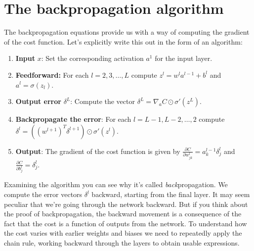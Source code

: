\documentclass[a4paper,twoside,10pt]{book}
\begin{document}
\section{The backpropagation algorithm}
\label{sec:2.6}
The backpropagation equations provide us with a way of computing the gradient of the cost function. Let's explicitly write this out in the form of an algorithm:
\begin{enumerate}
\item \textbf{Input} $x$: Set the corresponding activation $a^1$ for the input layer.
\item \textbf{Feedforward:} For each $l=2,3,\ldots{},L$ compute $z^l=w^la^{l-1}+b^l$ and $a^l=\sigma(z_l)$.
\item \textbf{Output error} $\delta^L$: Compute the vector $\delta^{L} = \nabla_a C \odot \sigma'(z^L)$.
\item \textbf{Backpropagate the error}: For each $l = L-1, L-2,\ldots, 2$ compute $\delta^{l} = ((w^{l+1})^T \delta^{l+1}) \odot \sigma'(z^{l})$.
\item \textbf{Output}: The gradient of the cost function is given by $\frac{\partial{}C}{\partial{}w^l_{jk}}=a^{l-1}_k\delta^l_j$ and $\frac{\partial{}C}{\partial{}b^l_j}=\delta^l_j$.
\end{enumerate}
Examining the algorithm you can see why it's called\textit{ back}propagation. We compute the error vectors $\delta^l$ backward, starting from the final layer. It may seem peculiar that we're going through the network backward. But if you think about the proof of backpropagation, the backward movement is a consequence of the fact that the cost is a function of outputs from the network. To understand how the cost varies with earlier weights and biases we need to repeatedly apply the chain rule, working backward through the layers to obtain usable expressions.
\end{document}
